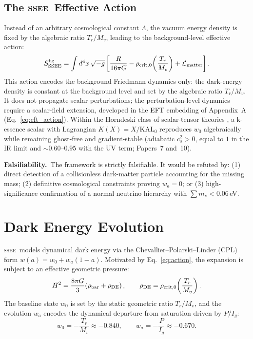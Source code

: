 \documentclass[12pt,a4paper]{article}
\newcommand{\SSEE}{\ifmmode\mathrm{SSEE}\else\textsc{ssee}\fi}
\newcommand{\KALz}{\mathrm{KAL}_0}
\newcommand{\wz}{w_0}
\newcommand{\wa}{w_a}
\begin{document}
\subsection{The \SSEE\ Effective Action}
\label{sec:action}

Instead of an arbitrary cosmological constant $\Lambda$, the vacuum energy density is
fixed by the algebraic ratio $T_r/M_v$, leading to the background-level
effective action:
\begin{equation}
  S_{\SSEE}^{\rm bg} = \int d^4x\,\sqrt{-g}
  \left[\frac{R}{16\pi G}
        - \rho_{{\rm crit},0}\!\left(\frac{T_r}{M_v}\right)
        + \mathcal{L}_{\rm matter}\right].
  \label{eq:action}
\end{equation}
This action encodes the background Friedmann dynamics only: the dark-energy
density is constant at the background level and set by the algebraic
ratio $T_r/M_v$.  It does not propagate scalar perturbations; the
perturbation-level dynamics require a scalar-field extension, developed
in the EFT embedding of Appendix~A (Eq.~\ref{eq:eft_action}).  Within the
Horndeski class of scalar-tensor theories \citep{Horndeski1974,Gubitosi2013,Bellini2015},
a k-essence scalar \citep{ArmendarizPicon2001} with Lagrangian $K(X)=X/\KALz$
reproduces $w_0$ algebraically while remaining ghost-free and gradient-stable
(adiabatic $c_s^2>0$, equal to $1$ in the IR limit and $\sim 0.60$--$0.95$
with the UV term; Papers~7 and~10).

\medskip
\noindent\textbf{Falsifiability.}\ The framework is strictly falsifiable. It would be
refuted by: (1) direct detection of a collisionless dark-matter particle accounting for
the missing mass; (2) definitive cosmological constraints proving $\wa=0$; or
(3) high-significance confirmation of a normal neutrino hierarchy with
$\sum m_\nu < 0.06$\,eV.



\section{Dark Energy Evolution}
\label{sec:de}

\SSEE\ models dynamical dark energy via the Chevallier--Polarski--Linder (CPL) form
\citep{Chevallier2001,Linder2003} $w(a)=\wz+\wa(1-a)$. Motivated by Eq.~\eqref{eq:action}, the expansion is subject to
an effective geometric pressure:
\begin{equation}
  H^2 = \frac{8\pi G}{3}\!\left(\rho_{\rm bar}+\rho_{\rm DE}\right),
  \qquad
  \rho_{\rm DE} = \rho_{{\rm crit},0}\!\left(\frac{T_r}{M_v}\right).
\end{equation}
The baseline state $\wz$ is set by the static geometric ratio $T_r/M_v$, and the evolution
$\wa$ encodes the dynamical departure from saturation driven by $P/I_g$:
\begin{equation}
  \wz = -\frac{T_r}{M_v} \approx -0.840,
  \qquad
  \wa = -\frac{P}{I_g}  \approx -0.670.
  \label{eq:ssee_pars}
\end{equation}
\end{document}
